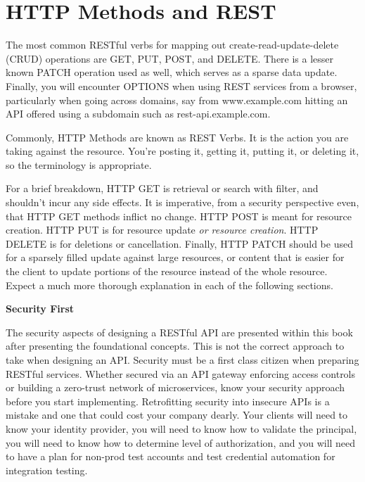 \section{HTTP Methods and REST}

The most common RESTful verbs for mapping out create-read-update-delete (CRUD) operations are GET, PUT, POST, and DELETE.  There is a lesser known PATCH operation used as well, which serves as a sparse data update.  Finally, you will encounter OPTIONS when using REST services from a browser, particularly when going across domains, say from www.example.com hitting an API offered using a subdomain such as rest-api.example.com.

Commonly, HTTP Methods are known as REST Verbs.  It is the action you are taking against the resource.  You're posting it, getting it, putting it, or deleting it, so the terminology is appropriate.

For a brief breakdown, HTTP GET is retrieval or search with filter, and shouldn't incur any side effects.  It is imperative, from a security perspective even, that HTTP GET methods inflict no change.  HTTP POST is meant for resource creation.  HTTP PUT is for resource update \textit{or resource creation}. HTTP DELETE is for deletions or cancellation.  Finally, HTTP PATCH should be used for a sparsely filled update against large resources, or content that is easier for the client to update portions of the resource instead of the whole resource.  Expect a much more thorough explanation in each of the following sections.

\begin{sidebar}
\begin{center}
\textbf{Security First}
\end{center}

The security aspects of designing a RESTful API are presented within this book after presenting the foundational concepts.  This is not the correct approach to take when designing an API.  Security must be a first class citizen when preparing RESTful services.  Whether secured via an API gateway enforcing access controls or building a zero-trust network of microservices, know your security approach before you start implementing.  Retrofitting security into insecure APIs is a mistake and one that could cost your company dearly.  Your clients will need to know your identity provider, you will need to know how to validate the principal, you will need to know how to determine level of authorization, and you will need to have a plan for non-prod test accounts and test credential automation for integration testing.

\end{sidebar}
